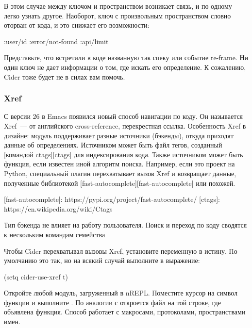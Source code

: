 В этом случае между ключом и пространством возникает связь, и по одному легко узнать другое. Наоборот, ключ с произвольным пространством словно оторван от кода, и это снижает его возможности:

\begin{english}
  \begin{clojure}
:user/id
:error/not-found
:api/limit
  \end{clojure}
\end{english}

Представьте, что встретили в коде названную так спеку или событие re-frame. Ни один ключ не дает информации о том, где искать его определение. К сожалению, Cider тоже будет не в силах вам помочь.

\subsubsection{Xref}

С версии 26 в Emacs появился новый способ навигации по коду. Он называется Xref~--- от английского cross-reference, перекрестная ссылка. Особенность Xref в дизайне: модуль поддерживает разные источники (бэкенды), откуда приходят данные об определениях. Источником может быть файл тегов, созданный [командой ctags][ctags] для индексирования кода. Также источником может быть функция, если известен иной алгоритм поиска. Например, если это проект на Python, специальный плагин перехватывает вызов Xref и возвращает данные, полученные библиотекой [fast-autocomplete][fast-autocomplete] или похожей.

[fast-autocomplete]: https://pypi.org/project/fast-autocomplete/
[ctags]: https://en.wikipedia.org/wiki/Ctags

Тип бэкенда не влияет на работу пользователя. Поиск и переход по коду сводятся к нескольким командам семейства 

Чтобы Cider перехватывал вызовы Xref, установите переменную  в истину. По умолчанию это так, но на всякий случай выполните в  выражение:

\begin{english}
  \begin{clojure}
(setq cider-use-xref t)
  \end{clojure}
\end{english}

Откройте любой модуль, загруженный в nREPL. Поместите курсор на символ функции и выполните . По аналогии с  откроется файл на той строке, где объявлена функция. Способ работает с макросами, протоколами, пространствами имен.

